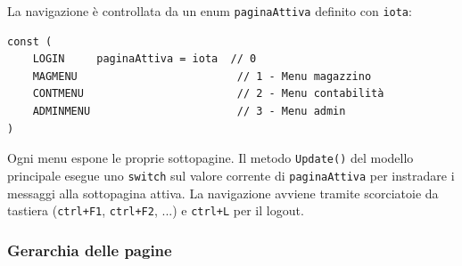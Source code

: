 \documentclass[a4paper,12pt]{article}
\begin{document}
La navigazione è controllata da un enum \texttt{paginaAttiva} definito con \texttt{iota}:

\begin{verbatim}
const (
    LOGIN     paginaAttiva = iota  // 0
    MAGMENU                         // 1 - Menu magazzino
    CONTMENU                        // 2 - Menu contabilità
    ADMINMENU                       // 3 - Menu admin
)
\end{verbatim}

Ogni menu espone le proprie sottopagine. Il metodo \texttt{Update()} del modello principale esegue uno \texttt{switch} sul valore corrente di \texttt{paginaAttiva} per instradare i messaggi alla sottopagina attiva. La navigazione avviene tramite scorciatoie da tastiera (\texttt{ctrl+F1}, \texttt{ctrl+F2}, ...) e \texttt{ctrl+L} per il logout.


\subsubsection{Gerarchia delle pagine}
\end{document}
